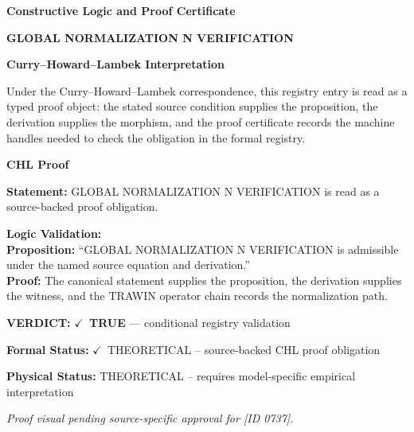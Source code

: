 \clearpage
\begingroup\tzpsupportsetup
\noindent\textbf{\fontsize{10.8pt}{12.8pt}\selectfont [ID 0737] Constructive Logic and Proof Certificate}\par
\noindent\textbf{\fontsize{10pt}{12pt}\selectfont GLOBAL NORMALIZATION N VERIFICATION}\par
\vspace{0.45em}
\begingroup
\footnotesize
\setlength{\parskip}{0.22em}
\setlength{\parindent}{0pt}
\noindent\textbf{Curry--Howard--Lambek Interpretation}\par
Under the Curry--Howard--Lambek correspondence, this registry entry is read as a typed proof
object: the stated source condition supplies the proposition, the derivation supplies the
morphism, and the proof certificate records the machine handles needed to check the obligation
in the formal registry.

\vspace{0.45em}
\noindent\textbf{CHL Proof}\par
\textbf{Statement:} GLOBAL NORMALIZATION N VERIFICATION is read as a source-backed proof obligation.

\textbf{Logic Validation:}\\
\textbf{Proposition:} ``GLOBAL NORMALIZATION N VERIFICATION is admissible under the named source equation and derivation.''\\
\textbf{Proof:} The canonical statement supplies the proposition, the derivation supplies the witness, and the TRAWIN operator chain records the normalization path.

\textbf{VERDICT:} \ensuremath{\checkmark}\ \textbf{TRUE} --- conditional registry validation

\textbf{Formal Status:} \ensuremath{\checkmark}\ THEORETICAL -- source-backed CHL proof obligation

\textbf{Physical Status:} THEORETICAL -- requires model-specific empirical interpretation
\par\vspace{0.45em}
\par
\vfill
\begingroup\footnotesize\itshape
Proof visual pending source-specific approval for [ID 0737].
\par\endgroup
\vfill
\endgroup
\endgroup
